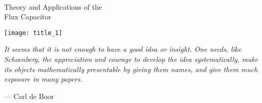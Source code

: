\cleardoublepage

\thispagestyle{empty}

\begin{spacing}{1}
  \setlength{\parindent}{0pt}
  
  {\LARGE\itshape\theauthor\par}
  
  \vspace{4em}
  
  {%
    \fontsize{40}{48}\selectfont\sffamily\bfseries%
    \hspace*{-0.1em}\\%
    \hspace*{-0.1em}%
    \par%
  }
  
  \vspace{2em}
  
  {\LARGE Theory and Applications of the\\Flux Capacitor\par}
  
  \vfill
  
  \begin{center}
    \texttt{[image: title\_1]}
  \end{center}
  
  \vfill
  
  {%
    \hfill%
    \hfill%
    \hfill%
    \par%
  }
\end{spacing}

\pagebreak

\thispagestyle{empty}

\vspace*{\fill}

\begin{minipage}{0.865\textwidth}%
  \begin{center}
    \begin{minipage}{0.65\textwidth}%
      \begin{flushleft}
        {\hugequote}%
        \textit{%
          It seems that it is not enough to have a good idea or insight.
          One needs, like Schoenberg, the appreciation and courage to develop the idea
          systematically, make its objects mathematically presentable by giving them
          names, and give them much exposure in many papers.%
        }
      \end{flushleft}
      \begin{flushright}
        \small--- Carl de Boor \cite{boor16}
      \end{flushright}
    \end{minipage}%
  \end{center}
\end{minipage}

